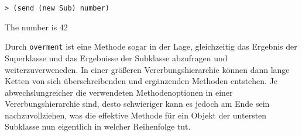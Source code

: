 \begin{lstlisting}
> (send (new Sub) number)
\end{lstlisting}
{\routput The number is 42}

Durch \texttt{overment} ist eine Methode sogar in der Lage, gleichzeitig das Ergebnis der Superklasse und das Ergebnisse der Subklasse abzufragen und weiterzuverweneden. In einer größeren Vererbungshierarchie können dann lange Ketten von sich überschreibenden und ergänzenden Methoden entstehen. Je abwechslungreicher die verwendeten Methodenoptionen in einer Vererbungshierarchie sind, desto schwieriger kann es jedoch am Ende sein nachzuvollziehen, was die effektive Methode für ein Objekt der untersten Subklasse nun eigentlich in welcher Reihenfolge tut.



